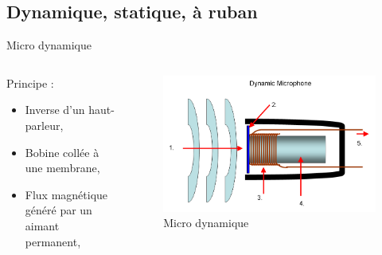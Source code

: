 \documentclass[aspectratio=169]{beamer}
\begin{document}
\subsection{Dynamique, statique, à ruban}

\begin{frame}{Micro dynamique}
\begin{columns}[t]\small
  \begin{column}{.5\textwidth}
  Principe :
  \begin{itemize}
	\item Inverse d'un haut-parleur,
	\item Bobine collée à une membrane,  
	\item Flux magnétique généré par un aimant permanent,
  \end{itemize}
  \end{column}
  \begin{column}{.5\textwidth}
	\begin{figure}[!h]
	\begin{center}
	\includegraphics[width=.8\textwidth]{figure/Mic-dynamic.png}
	\end{center}
	\caption{Micro dynamique}
	\end{figure}
  \end{column}
\end{columns}
\end{frame}
\end{document}
